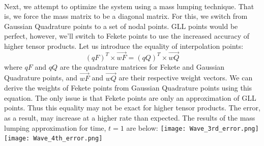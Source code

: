 \documentclass{article}
\begin{document}
\paragraph{}
Next, we attempt to optimize the system using a mass lumping technique. That is, we force the mass matrix to be a diagonal matrix. For this, we switch from Gaussian Quadrature points to a set of nodal points. GLL points would be perfect, however, we'll switch to Fekete points to use the increased accuracy of higher tensor products. Let us introduce the equality of interpolation points: 
\begin{equation*}
(qF)^T\times \vec{wF}=(qQ)^T\times \vec{wQ}
\end{equation*}
where $qF$ and $qQ$ are the quadrature matrices for Fekete and Gaussian Quadrature points, and $\vec{wF}$ and $\vec{wQ}$ are their respective weight vectors.
We can derive the weights of Fekete points from Gaussian Quadrature points using this equation. The only issue is that Fekete points are only an approximation of GLL points. Thus this equality may not be exact for higher tensor products. The error, as a result, may increase at a higher rate than expected. The results of the mass lumping approximation for time, $t=1$ are below:
\newline
\texttt{[image: Wave\_3rd\_error.png]} \texttt{[image: Wave\_4th\_error.png]}
\end{document}
